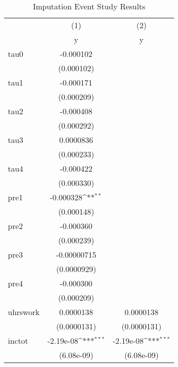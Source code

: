 \begin{table}[htbp]\centering
\def\sym#1{\ifmmode^{#1}\else\(^{#1}\)\fi}
\caption{Imputation Event Study Results}
\begin{tabular}{l*{2}{c}}
\hline\hline
            &\multicolumn{1}{c}{(1)}&\multicolumn{1}{c}{(2)}\\
            &\multicolumn{1}{c}{y}&\multicolumn{1}{c}{y}\\
\hline
tau0        &   -0.000102         &                     \\
            &  (0.000102)         &                     \\
[1em]
tau1        &   -0.000171         &                     \\
            &  (0.000209)         &                     \\
[1em]
tau2        &   -0.000408         &                     \\
            &  (0.000292)         &                     \\
[1em]
tau3        &   0.0000836         &                     \\
            &  (0.000233)         &                     \\
[1em]
tau4        &   -0.000422         &                     \\
            &  (0.000330)         &                     \\
[1em]
pre1        &   -0.000328\sym{**} &                     \\
            &  (0.000148)         &                     \\
[1em]
pre2        &   -0.000360         &                     \\
            &  (0.000239)         &                     \\
[1em]
pre3        & -0.00000715         &                     \\
            & (0.0000929)         &                     \\
[1em]
pre4        &   -0.000300         &                     \\
            &  (0.000209)         &                     \\
[1em]
uhrswork    &   0.0000138         &   0.0000138         \\
            & (0.0000131)         & (0.0000131)         \\
[1em]
inctot      &   -2.19e-08\sym{***}&   -2.19e-08\sym{***}\\
            &  (6.08e-09)         &  (6.08e-09)         \\

\end{tabular}
\end{table}
